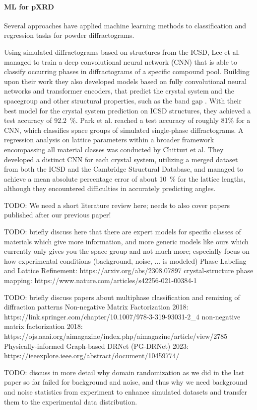 \paragraph{ML for pXRD} Several approaches have applied machine learning methods to classification and regression tasks for powder diffractograms.

Using simulated diffractograms based on structures from the ICSD, Lee et al. managed to train a deep convolutional neural network (CNN) that is able to classify occurring phases in diffractograms of a specific compound pool. \cite{Lee2020} Building upon their work they also developed models based on fully convolutional neural networks and transformer encoders, that predict the crystal system and the spacegroup and other structural properties, such as the band gap \cite{Lee2022}. With their best model for the crystal system prediction on ICSD structures, they achieved a test accuracy of \SI{92.2}{\percent}.
Park et al. reached a test accuracy of roughly 81\% for a CNN, which classifies space groups of simulated single-phase diffractograms. \cite{Park2017}
A regression analysis on lattice parameters within a broader framework encompassing all material classes was conducted by Chitturi et al.\cite{Chitturi2021} They developed a distinct CNN for each crystal system, utilizing a merged dataset from both the ICSD and the Cambridge Structural Database, and managed to achieve a mean absolute percentage error of about \SI{10}{\percent} for the lattice lengths, although they encountered difficulties in accurately predicting angles.

TODO: We need a short literature review here; needs to also cover papers published after our previous paper!

TODO: briefly discuss here that there are expert models for specific classes of materials which give more information, and more generic models like ours which currently only gives you the space group and not much more; especially focus on how experimental conditions (background, noise, ... is modeled)
Phase Labeling and Lattice Refinement: https://arxiv.org/abs/2308.07897
crystal-structure phase mapping: https://www.nature.com/articles/s42256-021-00384-1


TODO: briefly discuss papers about multiphase classification and remixing of diffraction patterns
Non-negative Matrix Factorization 2018: https://link.springer.com/chapter/10.1007/978-3-319-93031-2_4
non-negative matrix factorization 2018: https://ojs.aaai.org/aimagazine/index.php/aimagazine/article/view/2785
Physically-informed Graph-based DRNet (PG-DRNet) 2023: https://ieeexplore.ieee.org/abstract/document/10459774/

TODO: discuss in more detail why domain randomization as we did in the last paper so far failed for background and noise, and thus why we need background and noise statistics from experiment to enhance simulated datasets and transfer them to the experimental data distribution.